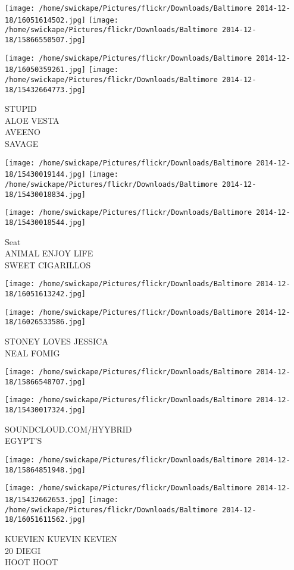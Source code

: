 \documentclass[10pt,letterpaper]{article}
\begin{document}
\texttt{[image: /home/swickape/Pictures/flickr/Downloads/Baltimore 2014-12-18/16051614502.jpg]}
\texttt{[image: /home/swickape/Pictures/flickr/Downloads/Baltimore 2014-12-18/15866550507.jpg]}

\texttt{[image: /home/swickape/Pictures/flickr/Downloads/Baltimore 2014-12-18/16050359261.jpg]}
\texttt{[image: /home/swickape/Pictures/flickr/Downloads/Baltimore 2014-12-18/15432664773.jpg]}

STUPID\\
ALOE VESTA\\
AVEENO\\
SAVAGE
\pagebreak

\texttt{[image: /home/swickape/Pictures/flickr/Downloads/Baltimore 2014-12-18/15430019144.jpg]}
\texttt{[image: /home/swickape/Pictures/flickr/Downloads/Baltimore 2014-12-18/15430018834.jpg]}

\texttt{[image: /home/swickape/Pictures/flickr/Downloads/Baltimore 2014-12-18/15430018544.jpg]}

Seat\\
ANIMAL ENJOY LIFE\\
SWEET CIGARILLOS
\pagebreak

\texttt{[image: /home/swickape/Pictures/flickr/Downloads/Baltimore 2014-12-18/16051613242.jpg]}

\vspace{0.25in}
\texttt{[image: /home/swickape/Pictures/flickr/Downloads/Baltimore 2014-12-18/16026533586.jpg]}

STONEY LOVES JESSICA\\
NEAL FOMIG
\pagebreak

\texttt{[image: /home/swickape/Pictures/flickr/Downloads/Baltimore 2014-12-18/15866548707.jpg]}

\vspace{0.25in}
\texttt{[image: /home/swickape/Pictures/flickr/Downloads/Baltimore 2014-12-18/15430017324.jpg]}

SOUNDCLOUD.COM/HYYBRID\\
EGYPT'S
\pagebreak

\texttt{[image: /home/swickape/Pictures/flickr/Downloads/Baltimore 2014-12-18/15864851948.jpg]}

\vspace{0.25in}
\texttt{[image: /home/swickape/Pictures/flickr/Downloads/Baltimore 2014-12-18/15432662653.jpg]}
\texttt{[image: /home/swickape/Pictures/flickr/Downloads/Baltimore 2014-12-18/16051611562.jpg]}

KUEVIEN KUEVIN KEVIEN\\
20 DIEGI\\
HOOT HOOT
\pagebreak
\end{document}
